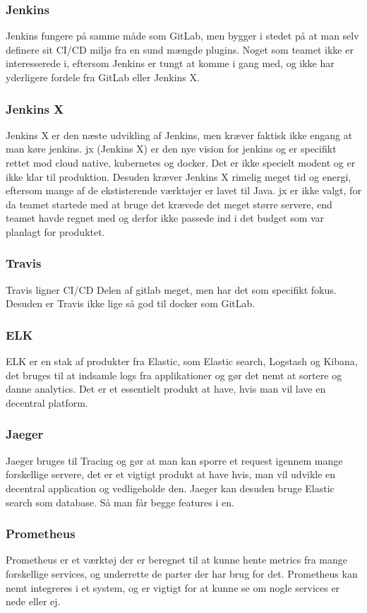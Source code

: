 \subsubsection{Jenkins}

Jenkins fungere på samme måde som GitLab, men bygger i stedet på at man selv definere sit CI/CD miljø fra en sund mængde plugins. Noget som teamet ikke er interesserede i, eftersom Jenkins er tungt at komme i gang med, og ikke har yderligere fordele fra GitLab eller Jenkins X.

\subsubsection{Jenkins X}

Jenkins X er den næste udvikling af Jenkins, men kræver faktisk ikke engang at man køre jenkins. jx (Jenkins X) er den nye vision for jenkins og er specifikt rettet mod cloud native, kubernetes og docker. Det er ikke specielt modent og er ikke klar til produktion. Desuden kræver Jenkins X rimelig meget tid og energi, eftersom mange af de ekstisterende værktøjer er lavet til Java. jx er ikke valgt, for da teamet startede med at bruge det krævede det meget større servere, end teamet havde regnet med og derfor ikke passede ind i det budget som var planlagt for produktet.

\subsubsection{Travis}

Travis ligner CI/CD  Delen af gitlab meget, men har det som specifikt fokus. Desuden er Travis ikke lige så god til docker som GitLab.

\subsubsection{ELK}

ELK er en stak af produkter fra Elastic, som Elastic search, Logstash og Kibana, det bruges til at indsamle logs fra applikationer og gør det nemt at sortere og danne analytics. Det er et essentielt produkt at have, hvis man vil lave en decentral platform.

\subsubsection{Jaeger}

Jaeger bruges til Tracing og gør at man kan sporre et request igennem mange forskellige servere, det er et vigtigt produkt at have hvis, man vil udvikle en decentral application og vedligeholde den. Jaeger kan desuden bruge Elastic search som database. Så man får begge features i en.

\subsubsection{Prometheus}

Prometheus er et værktøj der er beregnet til at kunne hente metrics fra mange forskellige services, og underrette de parter der har brug for det. Prometheus kan nemt integreres i et system, og er vigtigt for at kunne se om nogle services er nede eller ej.



